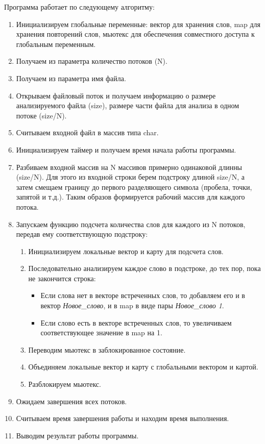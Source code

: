 \documentclass[12pt,a4paper]{report}
\begin{document}
			Программа работает по следующему алгоритму:
				\begin{enumerate}
					\item Инициализируем глобальные переменные: вектор для хранения слов, map для хранения повторений слов, мьютекс для обеспечения совместного доступа к глобальным переменным.
					\item Получаем из параметра количество потоков (N).
					\item Получаем из параметра имя файла.
					\item Открываем файловый поток и получаем информацию о размере анализируемого файла (size), размере части файла для анализа в одном потоке (size/N).
					\item Считываем входной файл в массив типа char.
					\item Инициализируем таймер и получаем время начала работы программы.
					\item Разбиваем входной массив на N массивов примерно одинаковой длинны (size/N). Для этого из входной строки берем подстроку длиной size/N, а затем смещаем границу до первого разделяющего символа (пробела, точки, запятой и т.д.). Таким образов формируется рабочий массив для каждого потока.
					\item Запускаем функцию подсчета количества слов для каждого из N потоков, передав ему соответствующую подстроку:
						\begin{enumerate}
							\item Инициализируем локальные вектор и карту для подсчета слов.
							\item Последовательно анализируем каждое слово в подстроке, до тех пор, пока не закончится строка:
							\begin{itemize}
								\item Если слова нет в векторе встреченных слов, то добавляем его и в вектор \textit{Новое\_слово}, и в map в виде пары \textit{Новое\_слово 1}.
								\item Если слово есть в векторе встреченных слов, то увеличиваем соответствующее значение в map на 1.
							\end{itemize}
							\item Переводим мьютекс в заблокированное состояние.
							\item Объединяем локальные вектор и карту с глобальными вектором и картой.
							\item Разблокируем мьютекс.
						\end{enumerate}
						\item Ожидаем завершения всех потоков.
						\item Считываем время завершения работы и находим время выполнения.
						\item Выводим результат работы программы.
					\end{enumerate}
				
\end{document}

